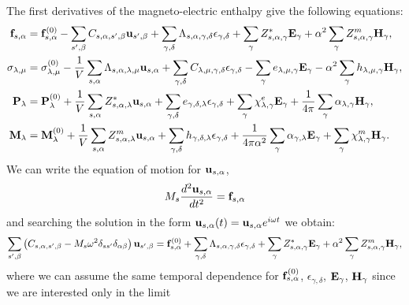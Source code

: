 \documentclass[12pt,a4paper]{article}
\begin{document}
{\color{web-blue}
The first derivatives of the magneto-electric enthalpy give the following equations:
\begin{align}
{\bf f}_{s,\alpha}&= {\bf f}^{(0)}_{s,\alpha}
-\sum_{s',\beta} C_{s,\alpha,s',\beta} {\bf u}_{s',\beta}
+\sum_{\gamma,\delta}
\Lambda_{s,\alpha,\gamma,\delta} 
\epsilon_{\gamma,\delta} +
\sum_{\gamma} Z^*_{s,\alpha,\gamma} {\bf E}_{\gamma}
+\alpha^2 \sum_{\gamma} 
Z^m_{s,\alpha,\gamma} {\bf H}_{\gamma}, \\
\sigma_{\lambda,\mu}&= \sigma_{\lambda,\mu}^{(0)}
-{1\over V} \sum_{s,\alpha}
\Lambda_{s,\alpha,\lambda,\mu} {\bf u}_{s,\alpha}
+\sum_{\gamma,\delta} C_{\lambda,\mu,\gamma,\delta}  
\epsilon_{\gamma,\delta} -
\sum_{\gamma} e_{\lambda,\mu,\gamma} 
 {\bf E}_{\gamma}
-\alpha^2 \sum_{\gamma}  h_{\lambda,\mu,\gamma} 
{\bf H}_{\gamma}, \\
{\bf P}_{\lambda}&= {\bf P}^{(0)}_{\lambda}
+{1\over V} \sum_{s,\alpha} Z^*_{s,\alpha,\lambda} 
{\bf u}_{s,\alpha} +
\sum_{\gamma,\delta} e_{\gamma,\delta,\lambda} 
\epsilon_{\gamma,\delta} +
\sum_{\gamma} 
\chi^e_{\lambda,\gamma}
{\bf E}_{\gamma} +
{1\over 4 \pi}\sum_{\gamma} \alpha_{\lambda,\gamma} 
{\bf H}_{\gamma}, \\
{\bf M}_{\lambda}&= {\bf M}^{(0)}_{\lambda}
+{1\over V}\sum_{s,\alpha} 
Z^m_{s,\alpha,\lambda} {\bf u}_{s,\alpha} +
\sum_{\gamma,\delta}  h_{\gamma,\delta,\lambda} 
\epsilon_{\gamma,\delta} 
+{1\over 4 \pi \alpha^2} 
\sum_{\gamma} \alpha_{\gamma,\lambda} {\bf E}_{\gamma}
+\sum_{\gamma} 
\chi^m_{\lambda,\gamma}
{\bf H}_{\gamma}.
\end{align}
We can write the equation of motion for ${\bf u}_{s,\alpha}$,
\begin{equation}
M_s {d^2 {\bf u}_{s,\alpha} \over d t^2} = {\bf f}_{s,\alpha}
\end{equation}
and searching the solution in the form ${\bf u}_{s,\alpha}(t)=
{\bf u}_{s,\alpha} e^{i\omega t}$ we obtain:
\begin{equation}
\sum_{s',\beta} \left(C_{s,\alpha,s',\beta} - 
M_s \omega^2 \delta_{ss'}\delta_{\alpha\beta}\right)
{\bf u}_{s',\beta}= {\bf f}^{(0)}_{s,\alpha} + \sum_{\gamma,\delta} 
\Lambda_{s,\alpha,\gamma,\delta} \epsilon_{\gamma,\delta}
+ \sum_{\gamma} Z^*_{s,\alpha,\gamma} {\bf E}_{\gamma} 
+ \alpha^2 \sum_{\gamma} Z^m_{s,\alpha,\gamma} 
{\bf H}_{\gamma},
\end{equation}
where we can assume the same temporal dependence for
${\bf f}^{(0)}_{s,\alpha}$, $\epsilon_{\gamma,\delta}$,
${\bf E}_{\gamma}$,
${\bf H}_{\gamma}$ since we are interested only in the limit
}
\end{document}
